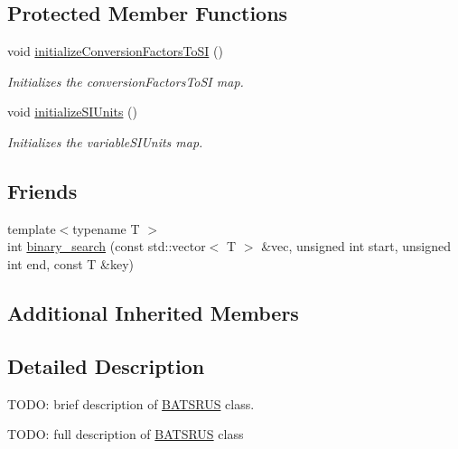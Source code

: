 \subsection*{Protected Member Functions}
\begin{DoxyCompactItemize}
\item 
void \hyperlink{classccmc_1_1_b_a_t_s_r_u_s_a86dddd02ea3db46068f482d59f77df86}{initialize\-Conversion\-Factors\-To\-S\-I} ()
\begin{DoxyCompactList}\small\item\em Initializes the conversion\-Factors\-To\-S\-I map.  \end{DoxyCompactList}\item 
void \hyperlink{classccmc_1_1_b_a_t_s_r_u_s_ab86a0088002795bbf4b60fd89576604e}{initialize\-S\-I\-Units} ()
\begin{DoxyCompactList}\small\item\em Initializes the variable\-S\-I\-Units map.  \end{DoxyCompactList}\end{DoxyCompactItemize}
\subsection*{Friends}
\begin{DoxyCompactItemize}
\item 
{\footnotesize template$<$typename T $>$ }\\int \hyperlink{classccmc_1_1_b_a_t_s_r_u_s_ae33f5d913530545859c1b8b43200c237}{binary\-\_\-search} (const std\-::vector$<$ T $>$ \&vec, unsigned int start, unsigned int end, const T \&key)
\end{DoxyCompactItemize}
\subsection*{Additional Inherited Members}


\subsection{Detailed Description}
T\-O\-D\-O\-: brief description of \hyperlink{classccmc_1_1_b_a_t_s_r_u_s}{B\-A\-T\-S\-R\-U\-S} class. 

T\-O\-D\-O\-: full description of \hyperlink{classccmc_1_1_b_a_t_s_r_u_s}{B\-A\-T\-S\-R\-U\-S} class 

